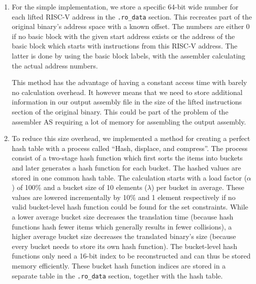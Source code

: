 \documentclass[course=eragp]{aspdoc}
\begin{document}
\begin{enumerate}
    \item For the simple implementation, we store a specific 64-bit wide number for each lifted RISC-V address
          in the \texttt{.ro\_data} section. This recreates part of the original binary's address
          space with a known offset. The numbers are either 0 if no basic block with the given start address
          exists or the address of the basic block which starts with instructions from this RISC-V address.
          The latter is done by using the basic block labels, with the assembler calculating the actual
          address numbers.
          \par
          This method has the advantage of having a constant access time with barely no calculation overhead. It
          however means that we need to store additional information in our output assembly file in the size of the
          lifted instructions section of the original binary. This could be part of the problem of the
          assembler AS requiring a lot of memory for assembling the output assembly.

    \item To reduce this size overhead, we implemented a method for creating a perfect hash table with a
          process called ``Hash, displace, and compress''\cite{CHD}. The process consist of a two-stage hash
          function which first sorts the items into buckets and later generates a hash function for each
          bucket. The hashed values are stored in one common hash table. The calculation starts with a load
          factor ($\alpha$) of 100\% and a bucket size of 10 elements ($\lambda$) per bucket in average. These values are lowered
          incrementally by 10\% and 1 element respectively if no valid bucket-level hash function could be found for the
          set constraints.
          While a lower average bucket size decreases the translation time (because hash functions hash
          fewer items which generally results in fewer collisions), a higher average bucket size decreases the translated binary's size (because
          every bucket needs to store its own hash function).
          The bucket-level hash functions only need a 16-bit index to be reconstructed and can
          thus
          be stored memory efficiently. These bucket hash function indices are stored in a separate table in
          the \texttt{.ro\_data} section, together with the hash table.

          \par


\end{enumerate}
\end{document}
